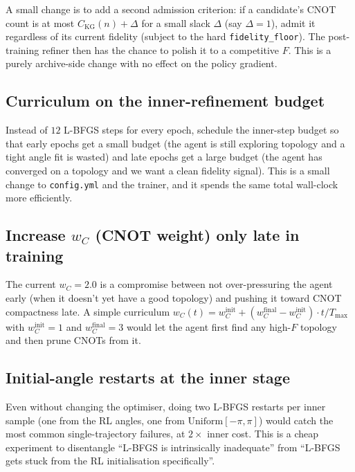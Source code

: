 \documentclass[11pt,a4paper]{article}
\begin{document}
A small change is to add a second admission criterion: if a candidate's
CNOT count is at most $C_{\mathrm{KG}}(n) + \Delta$ for a small slack
$\Delta$ (say $\Delta = 1$), admit it regardless of its current
fidelity (subject to the hard \texttt{fidelity\_floor}). The post-training
refiner then has the chance to polish it to a competitive $F$. This is a
purely archive-side change with no effect on the policy gradient.

\subsection{Curriculum on the inner-refinement budget}

Instead of $12$ L-BFGS steps for every epoch, schedule the inner-step
budget so that early epochs get a small budget (the agent is still
exploring topology and a tight angle fit is wasted) and late epochs get a
large budget (the agent has converged on a topology and we want a clean
fidelity signal). This is a small change to \texttt{config.yml} and the
trainer, and it spends the same total wall-clock more efficiently.

\subsection{Increase $w_C$ (CNOT weight) only late in training}

The current $w_C = 2.0$ is a compromise between not over-pressuring the
agent early (when it doesn't yet have a good topology) and pushing it
toward CNOT compactness late. A simple curriculum
$w_C(t) = w_C^{\text{init}} + (w_C^{\text{final}} - w_C^{\text{init}}) \cdot t / T_{\max}$
with $w_C^{\text{init}} = 1$ and $w_C^{\text{final}} = 3$ would let the
agent first find any high-$F$ topology and then prune CNOTs from it.

\subsection{Initial-angle restarts at the inner stage}

Even without changing the optimiser, doing two L-BFGS restarts per inner
sample (one from the RL angles, one from $\mathrm{Uniform}[-\pi, \pi]$)
would catch the most common single-trajectory failures, at $2\times$
inner cost. This is a cheap experiment to disentangle ``L-BFGS is
intrinsically inadequate'' from ``L-BFGS gets stuck from the RL
initialisation specifically''.

\end{document}
